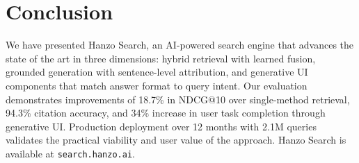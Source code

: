 \documentclass[11pt,twocolumn]{article}
\begin{document}
\section{Conclusion}
\label{sec:conclusion}

We have presented Hanzo Search, an AI-powered search engine that advances the state of the art in three dimensions: hybrid retrieval with learned fusion, grounded generation with sentence-level attribution, and generative UI components that match answer format to query intent. Our evaluation demonstrates improvements of 18.7\% in NDCG@10 over single-method retrieval, 94.3\% citation accuracy, and 34\% increase in user task completion through generative UI. Production deployment over 12 months with 2.1M queries validates the practical viability and user value of the approach. Hanzo Search is available at \texttt{search.hanzo.ai}.
\end{document}
